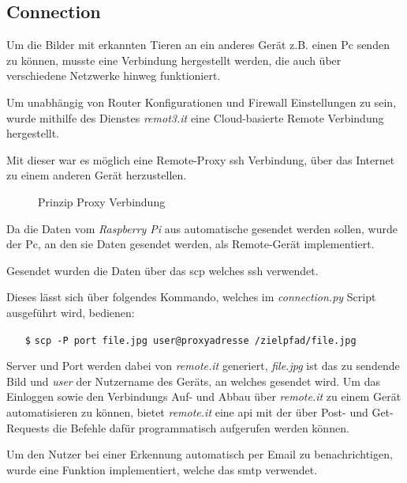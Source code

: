 \subsection*{Connection}

Um die Bilder mit erkannten Tieren an ein anderes Gerät 
z.B. einen Pc senden zu können, musste eine Verbindung
hergestellt werden, die auch über verschiedene Netzwerke 
hinweg funktioniert.

Um unabhängig von Router Konfigurationen und Firewall 
Einstellungen zu sein, wurde mithilfe des
Dienstes \textit{remot3.it} \cite{remoteit}
eine Cloud-basierte Remote Verbindung hergestellt.

Mit dieser war es möglich eine Remote-Proxy \Gls{ssh}
Verbindung, über das Internet zu einem anderen Gerät 
herzustellen.

\begin{figure}[H]
    \centering
    \def\svgwidth{0.7\textwidth}
    
    \caption{Prinzip Proxy Verbindung}
    \label{fig:remoteit}
\end{figure}

Da die Daten vom \textit{Raspberry Pi} aus
 automatische gesendet werden sollen, wurde der Pc, an den 
sie Daten gesendet werden, als Remote-Gerät implementiert.

Gesendet wurden die Daten über das \Gls{scp}
welches \Gls{ssh} verwendet.

Dieses lässt sich über folgendes Kommando,
welches im \textit{connection.py}
Script ausgeführt wird, bedienen:
\begin{itemize}
    \item[\texttt{\$}] \texttt{scp -P port file.jpg 
    user@proxyadresse /zielpfad/file.jpg}
\end{itemize}

Server und Port werden dabei von \textit{remote.it}
generiert, \textit{file.jpg} ist das zu sendende Bild und
\textit{user} der Nutzername des Geräts,
an welches gesendet wird.
Um das Einloggen sowie den Verbindungs Auf- und Abbau 
über \textit{remote.it} zu einem Gerät automatisieren zu können,
bietet \textit{remote.it} eine \Gls{api} mit der
über Post- und Get-Requests die Befehle dafür
programmatisch aufgerufen werden können.

Um den Nutzer bei einer Erkennung automatisch 
per Email zu benachrichtigen, wurde 
eine Funktion implementiert, welche das 
\Gls{smtp} verwendet.
